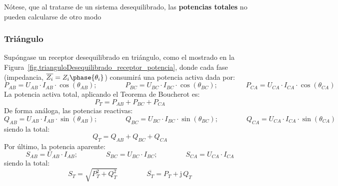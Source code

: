 	\begin{remark}
	    Nótese, que al tratarse de un sistema desequilibrado, las \textbf{potencias totales} no pueden calcularse de otro modo
	\end{remark}
	
	\subsubsection{Triángulo}
	
	Supóngase un receptor desequilibrado en triángulo, como el mostrado en la Figura~\ref{fig.trianguloDesequilibrado_receptor_potencia}, donde cada fase (impedancia, $\overline{Z_i}=Z_i\phase{\theta_i}$) consumirá una potencia activa dada por: 
	\begin{equation*}
	    P_{AB}=U_{AB}\cdot I_{AB} \cdot \cos(\theta_{AB});\qquad \qquad
	    P_{BC}=U_{BC}\cdot I_{BC} \cdot \cos(\theta_{BC});\qquad \qquad
	    P_{CA}=U_{CA}\cdot I_{CA} \cdot \cos(\theta_{CA})
	\end{equation*}
	La potencia activa total, aplicando el Teorema de Boucherot es:
	\begin{equation}
	    \boxed{P_T=P_{AB}+P_{BC}+P_{CA}}
	\end{equation}
	De forma análoga, las potencias reactivas:
	\begin{equation*}
	    Q_{AB}=U_{AB}\cdot I_{AB} \cdot \sin(\theta_{AB});\qquad \qquad
	    Q_{BC}=U_{BC}\cdot I_{BC} \cdot \sin(\theta_{BC});\qquad \qquad
	    Q_{CA}=U_{CA}\cdot I_{CA} \cdot \sin(\theta_{CA})
	\end{equation*}
	siendo la total: 
	\begin{equation}
	    \boxed{Q_T=Q_{AB}+Q_{BC}+Q_{CA}}
	\end{equation}
	Por último, la potencia aparente: 
	\begin{equation*}
	    S_{AB}=U_{AB}\cdot I_{AB};\qquad \qquad
	    S_{BC}=U_{BC}\cdot I_{BC};\qquad \qquad
	    S_{CA}=U_{CA}\cdot I_{CA}
	\end{equation*}
	siendo la total: 
	\begin{equation}
	    \boxed{S_T=\sqrt{P_T^2+Q_T^2}}\,\qquad\qquad \boxed{\overline{S_T}=P_T+\mathrm{j}\,Q_T}
	\end{equation}
	

